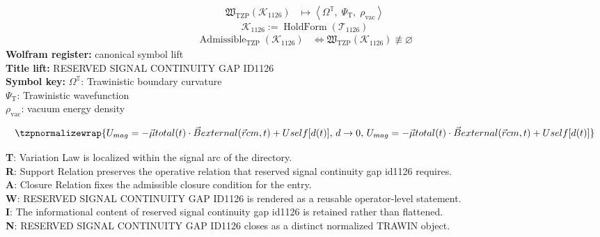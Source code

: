 \noindent
\begin{minipage}[t]{0.48\linewidth}
\begingroup
\small
\[
\begin{aligned}
\mathfrak{W}_{\mathrm{TZP}}\!\left(\mathcal{K}_{1126}\right)
&\longmapsto
\left\langle \Omega^{\mathbb{T}},\; \Psi_{\mathrm{T}},\; \rho_{\mathrm{vac}} \right\rangle
\end{aligned}
\]
\[
\mathcal{K}_{1126}
:=
\operatorname{HoldForm}\!\left(\mathcal{T}_{1126}\right)
\]
\[
\begin{aligned}
\operatorname{Admissible}_{\mathrm{TZP}}\!\left(\mathcal{K}_{1126}\right)
&\Longleftrightarrow
\mathfrak{W}_{\mathrm{TZP}}\!\left(\mathcal{K}_{1126}\right)\not\equiv\varnothing
\end{aligned}
\]
\textbf{Wolfram register:} canonical symbol lift\\
\textbf{Title lift:} RESERVED SIGNAL CONTINUITY GAP ID1126\\
\textbf{Symbol key:} \(\Omega^{\mathbb{T}}\): Trawinistic boundary curvature\\ \(\Psi_{\mathrm{T}}\): Trawinistic wavefunction\\ \(\rho_{\mathrm{vac}}\): vacuum energy density
\par
\endgroup
\end{minipage}\hfill
\begin{minipage}[t]{0.48\linewidth}
\[
\tzpnormalizewrap{U_{mag} = -\vec{\mu} {total}(t) \cdot \vec{B} {external}(\vec{r} {cm}, t) + U {self}[d(t)],\,d \to 0,\,U_{mag} = -\vec{\mu} {total}(t) \cdot \vec{B} {external}(\vec{r} {cm}, t) + U {self}[d(t)]}
\]

\small
\textbf{T}: Variation Law is localized within the signal arc of the directory.\\
\textbf{R}: Support Relation preserves the operative relation that reserved signal continuity gap id1126 requires.\\
\textbf{A}: Closure Relation fixes the admissible closure condition for the entry.\\
\textbf{W}: RESERVED SIGNAL CONTINUITY GAP ID1126 is rendered as a reusable operator-level statement.\\
\textbf{I}: The informational content of reserved signal continuity gap id1126 is retained rather than flattened.\\
\textbf{N}: RESERVED SIGNAL CONTINUITY GAP ID1126 closes as a distinct normalized TRAWIN object.
\normalsize
\end{minipage}

